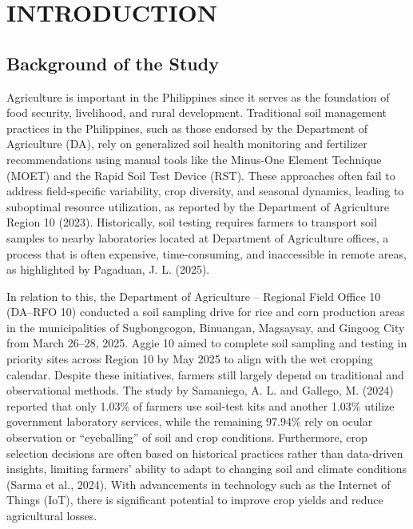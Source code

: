 \chapter{INTRODUCTION}

{\baselineskip
	
	\section{Background of the Study}
	
	Agriculture is important in the Philippines since it serves as the foundation of food security, livelihood, and rural development. Traditional soil management practices in the Philippines, such as those endorsed by the Department of Agriculture (DA), rely on generalized soil health monitoring and fertilizer recommendations using manual tools like the Minus-One Element Technique (MOET) and the Rapid Soil Test Device (RST). These approaches often fail to address field-specific variability, crop diversity, and seasonal dynamics, leading to suboptimal resource utilization, as reported by the Department of Agriculture Region 10 (2023). Historically, soil testing requires farmers to transport soil samples to nearby laboratories located at Department of Agriculture offices, a process that is often expensive, time-consuming, and inaccessible in remote areas, as highlighted by Pagaduan, J. L. (2025).
	
	In relation to this, the Department of Agriculture – Regional Field Office 10 (DA–RFO 10) conducted a soil sampling drive for rice and corn production areas in the municipalities of Sugbongcogon, Binuangan, Magsaysay, and Gingoog City from March 26–28, 2025. Aggie 10 aimed to complete soil sampling and testing in priority sites across Region 10 by May 2025 to align with the wet cropping calendar. Despite these initiatives, farmers still largely depend on traditional and observational methods. The study by Samaniego, A. L. and Gallego, M. (2024) reported that only 1.03\% of farmers use soil-test kits and another 1.03\% utilize government laboratory services, while the remaining 97.94\% rely on ocular observation or “eyeballing” of soil and crop conditions. Furthermore, crop selection decisions are often based on historical practices rather than data-driven insights, limiting farmers’ ability to adapt to changing soil and climate conditions (Sarma et al., 2024). With advancements in technology such as the Internet of Things (IoT), there is significant potential to improve crop yields and reduce agricultural losses.
	
}
